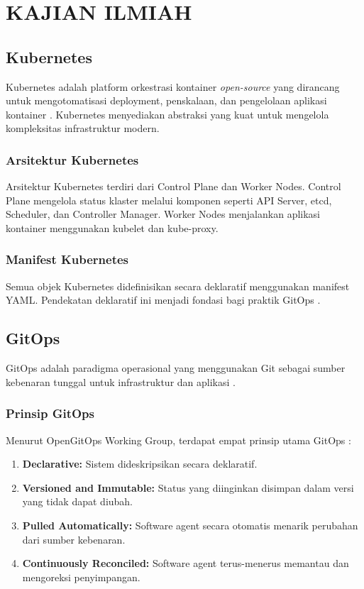 \chapter{KAJIAN ILMIAH}

\section{Kubernetes}

Kubernetes adalah platform orkestrasi kontainer \textit{open-source} yang dirancang untuk mengotomatisasi deployment, penskalaan, dan pengelolaan aplikasi kontainer \citep{kubernetes2022}. Kubernetes menyediakan abstraksi yang kuat untuk mengelola kompleksitas infrastruktur modern.

\subsection{Arsitektur Kubernetes}

Arsitektur Kubernetes terdiri dari Control Plane dan Worker Nodes. Control Plane mengelola status klaster melalui komponen seperti API Server, etcd, Scheduler, dan Controller Manager. Worker Nodes menjalankan aplikasi kontainer menggunakan kubelet dan kube-proxy.

\subsection{Manifest Kubernetes}

Semua objek Kubernetes didefinisikan secara deklaratif menggunakan manifest YAML. Pendekatan deklaratif ini menjadi fondasi bagi praktik GitOps \citep{kubernetes-docs}.

\section{GitOps}

GitOps adalah paradigma operasional yang menggunakan Git sebagai sumber kebenaran tunggal untuk infrastruktur dan aplikasi \citep{weaveworks-gitops}.

\subsection{Prinsip GitOps}

Menurut OpenGitOps Working Group, terdapat empat prinsip utama GitOps \citep{gitops-principles}:

\begin{enumerate}
    \item \textbf{Declarative:} Sistem dideskripsikan secara deklaratif.
    \item \textbf{Versioned and Immutable:} Status yang diinginkan disimpan dalam versi yang tidak dapat diubah.
    \item \textbf{Pulled Automatically:} Software agent secara otomatis menarik perubahan dari sumber kebenaran.
    \item \textbf{Continuously Reconciled:} Software agent terus-menerus memantau dan mengoreksi penyimpangan.
\end{enumerate}

